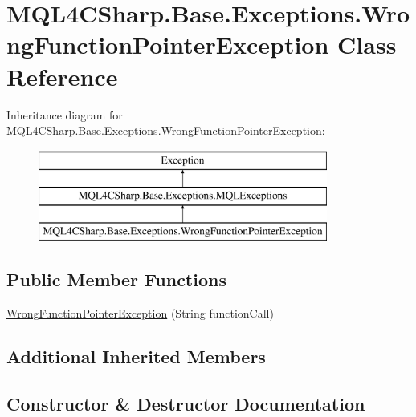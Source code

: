 \hypertarget{class_m_q_l4_c_sharp_1_1_base_1_1_exceptions_1_1_wrong_function_pointer_exception}{}\section{M\+Q\+L4\+C\+Sharp.\+Base.\+Exceptions.\+Wrong\+Function\+Pointer\+Exception Class Reference}
\label{class_m_q_l4_c_sharp_1_1_base_1_1_exceptions_1_1_wrong_function_pointer_exception}
Inheritance diagram for M\+Q\+L4\+C\+Sharp.\+Base.\+Exceptions.\+Wrong\+Function\+Pointer\+Exception\+:\begin{figure}[H]
\begin{center}
\leavevmode
\includegraphics[height=3.000000cm]{class_m_q_l4_c_sharp_1_1_base_1_1_exceptions_1_1_wrong_function_pointer_exception}
\end{center}
\end{figure}
\subsection*{Public Member Functions}
\begin{DoxyCompactItemize}
\item 
\hyperlink{class_m_q_l4_c_sharp_1_1_base_1_1_exceptions_1_1_wrong_function_pointer_exception_a4f4631d7c07018a777233933da3efc1c}{Wrong\+Function\+Pointer\+Exception} (String function\+Call)
\end{DoxyCompactItemize}
\subsection*{Additional Inherited Members}


\subsection{Constructor \& Destructor Documentation}
